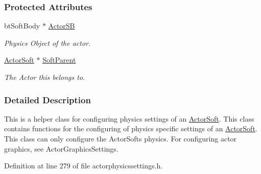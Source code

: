 \subsubsection*{Protected Attributes}
\begin{DoxyCompactItemize}
\item 
\hypertarget{classMezzanine_1_1ActorSoftPhysicsSettings_a44408487d6458ee64320be6d1283c1c0}{
btSoftBody $\ast$ \hyperlink{classMezzanine_1_1ActorSoftPhysicsSettings_a44408487d6458ee64320be6d1283c1c0}{ActorSB}}
\label{classMezzanine_1_1ActorSoftPhysicsSettings_a44408487d6458ee64320be6d1283c1c0}

\begin{DoxyCompactList}\small\item\em Physics Object of the actor. \item\end{DoxyCompactList}\item 
\hypertarget{classMezzanine_1_1ActorSoftPhysicsSettings_aa895658bc511f318b4a31234823d3e5c}{
\hyperlink{classMezzanine_1_1ActorSoft}{ActorSoft} $\ast$ \hyperlink{classMezzanine_1_1ActorSoftPhysicsSettings_aa895658bc511f318b4a31234823d3e5c}{SoftParent}}
\label{classMezzanine_1_1ActorSoftPhysicsSettings_aa895658bc511f318b4a31234823d3e5c}

\begin{DoxyCompactList}\small\item\em The Actor this belongs to. \item\end{DoxyCompactList}\end{DoxyCompactItemize}


\subsubsection{Detailed Description}
This is a helper class for configuring physics settings of an \hyperlink{classMezzanine_1_1ActorSoft}{ActorSoft}. This class contains functions for the configuring of physics specific settings of an \hyperlink{classMezzanine_1_1ActorSoft}{ActorSoft}. This class can only configure the ActorSofts physics. For configuring actor graphics, see ActorGraphicsSettings. 

Definition at line 279 of file actorphysicssettings.h.



